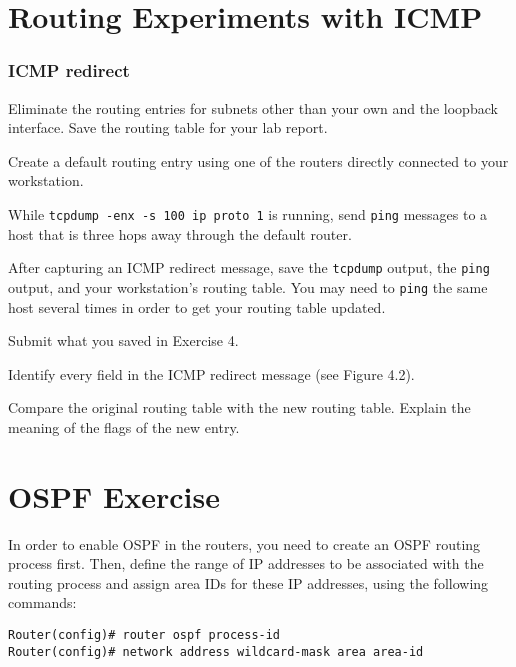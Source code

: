 \documentclass{../UTNetLab}
\begin{document}
\part{Routing Experiments with ICMP}
\section{ICMP redirect}
    Eliminate the routing entries for subnets other than your own and the loopback interface.
    Save the routing table for your lab report.

    Create a default routing entry using one of the routers directly connected to your workstation.

    While \lstinline{tcpdump -enx -s 100 ip proto 1} is running, send \lstinline{ping} messages to a host that is three hops away through the default router.

    After capturing an ICMP redirect message, save the \lstinline{tcpdump} output, the \lstinline{ping} output, and your workstation’s routing table.
    You may need to \lstinline{ping} the same host several times in order to get your routing table updated.
    
    \begin{report}
        \item Submit what you saved in Exercise 4.
        
        \item Identify every field in the ICMP redirect message (see Figure 4.2).
        
        \item Compare the original routing table with the new routing table. Explain the meaning of the flags of the new entry.
    \end{report}


\part{OSPF Exercise}
    In order to enable OSPF in the routers, you need to create an OSPF routing process first.
    Then, define the range of IP addresses to be associated with the routing process and assign area IDs for these IP addresses, using the following commands:
    \begin{lstlisting}[language={cisco}, emph={process-id, area-id, address, wildcard-mask}]
Router(config)# router ospf process-id
Router(config)# network address wildcard-mask area area-id
    \end{lstlisting}
    
\end{document}
